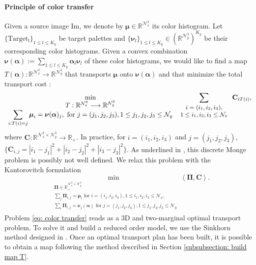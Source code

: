 \documentclass{article}
\def\RR{\mathbb{R}}
\def\cN{\mathcal{N}}
\def\aalpha{\boldsymbol{\alpha}}
\def\PPi{\boldsymbol{\Pi}}
\def\mmu{\boldsymbol{\mu}}
\def\nnu{\boldsymbol{\nu}}
\def\CC{\mathbf{C}}
\begin{document}
\paragraph{Principle of color transfer}
Given a source image $\mathrm{Im}$, we denote by $\mmu \in \RR^{\cN^3_x}$ its color histogram. Let  $\{\mathrm{Target_l}\}_{1\leq l \leq  K_y}$ be target palettes and $\{ \nnu_l \}_{1\leq l \leq K_y} \in (\RR^{\cN_y^3})^{K_y}$ be their corresponding color histograms. Given a convex combination $\displaystyle \nnu(\aalpha) := \sum_{1 \leq l \leq K_y} \aalpha_l \nnu_l $ of these color histograms, we would like to find a map $T(\aalpha) : \RR^{\cN^3_x} \longrightarrow \RR^{\cN^3_y}$ that transports $\mmu$ onto $\nnu(\aalpha)$ and that minimize the total transport cost :
%
\begin{equation}
    \mathop{\min}_{\begin{array}{c}
    T : \RR^{\cN^3_x} \longrightarrow \RR^{\cN^3_y} \\
   \displaystyle \sum_{i : T(i) = j} \mmu_i = \nnu(\aalpha)_j, \text{ for } j = (j_1, j_2, j_3), 1 \leq j_1, j_2, j_3 \leq \cN_y
    \end{array} }
    \displaystyle \sum_{\small\begin{array}{c} i = (i_1, i_2, i_3),\\ 1 \leq i_1, i_2, i_3 \leq \cN_x \end{array}} \CC_{i T(i)}, 
\end{equation}
%
where $\CC : \RR^{\cN^3_x\times  \cN^3_y} \longrightarrow \RR_+$. In practice, for $i = (i_1, i_2, i_3)$ and $j = (j_1, j_2, j_3)$, $\{\CC_{i,j} = |i_1 - j_1|^2 + |i_2 - j_2|^2 + |i_3 - j_3|^2 \}$.
As underlined in \cite{COTFNT}, this discrete Monge problem is possibly not well defined. We relax this problem with the Kantorovitch formulation
%
\begin{equation}\label{eq: color transfer}
\displaystyle \mathop{\min}_{\begin{array}{cc}
&\PPi \in \RR_+^{\cN^3_x \times \cN^3_y} \\
&\displaystyle \sum_{j} \PPi_{i,j} = \mmu_i \text{ for } i = (i_1, i_2, i_3), 1 \leq i_1, i_2, i_3 \leq \cN_x,\\
&\displaystyle \sum_{i} \PPi_{i,j} = \nnu_j(\aalpha) \text{ for } j = (j_1, j_2, j_3), 1 \leq j_1, j_2, j_3 \leq \cN_y \\
\end{array}
}
\left\langle \PPi, \CC \right\rangle .
\end{equation}
%
Problem \eqref{eq: color transfer} reads as a 3D and two-marginal optimal transport problem.
To solve it and build a reduced order model, we use the Sinkhorn method designed in  \cite{Storimage}.
%
Once an optimal transport plan has been built, it is possible to obtain a map following the method described in Section \ref{subsubsection: build map T}.
\end{document}
